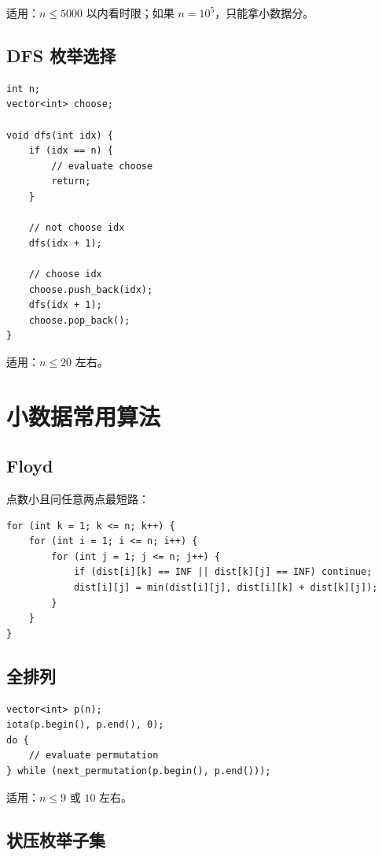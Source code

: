适用：$n \le 5000$ 以内看时限；如果 $n=10^5$，只能拿小数据分。

\subsection{DFS 枚举选择}

\begin{lstlisting}
int n;
vector<int> choose;

void dfs(int idx) {
    if (idx == n) {
        // evaluate choose
        return;
    }

    // not choose idx
    dfs(idx + 1);

    // choose idx
    choose.push_back(idx);
    dfs(idx + 1);
    choose.pop_back();
}
\end{lstlisting}

适用：$n \le 20$ 左右。

\section{小数据常用算法}\label{sec:08-5}

\subsection{Floyd}

点数小且问任意两点最短路：

\begin{lstlisting}
for (int k = 1; k <= n; k++) {
    for (int i = 1; i <= n; i++) {
        for (int j = 1; j <= n; j++) {
            if (dist[i][k] == INF || dist[k][j] == INF) continue;
            dist[i][j] = min(dist[i][j], dist[i][k] + dist[k][j]);
        }
    }
}
\end{lstlisting}

\subsection{全排列}

\begin{lstlisting}
vector<int> p(n);
iota(p.begin(), p.end(), 0);
do {
    // evaluate permutation
} while (next_permutation(p.begin(), p.end()));
\end{lstlisting}

适用：$n \le 9$ 或 $10$ 左右。

\subsection{状压枚举子集}

